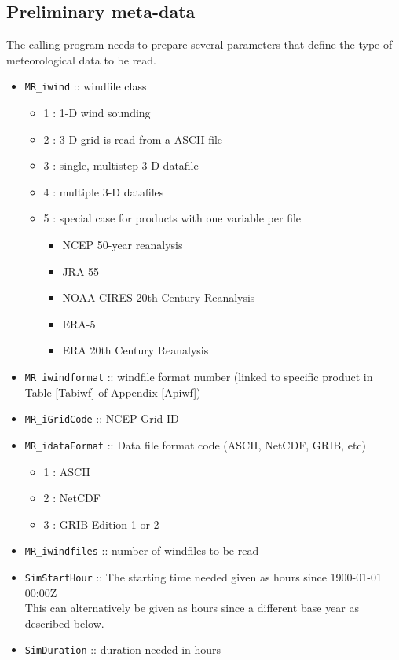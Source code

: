 \documentclass[11pt]{article}   %
\begin{document}
\subsection{Preliminary meta-data}\label{SSecPrelimMetaData}
The calling program needs to prepare several parameters that define the type of meteorological
data to be read.  
\begin{itemize}
\item \texttt{MR\_iwind} :: windfile class 
 \begin{itemize}
 \item 1 : 1-D wind sounding
 \item 2 : 3-D grid is read from a ASCII file
 \item 3 : single, multistep 3-D datafile
 \item 4 : multiple 3-D datafiles
 \item 5 : special case for products with one variable per file
   \begin{itemize}
     \item NCEP 50-year reanalysis
     \item JRA-55
     \item NOAA-CIRES 20th Century Reanalysis
     \item ERA-5
     \item ERA 20th Century Reanalysis
   \end{itemize}
 \end{itemize}
\item \texttt{MR\_iwindformat} :: windfile format number (linked to specific product in Table
  \ref{Tabiwf} of Appendix \ref{Apiwf})
\item \texttt{MR\_iGridCode} :: NCEP Grid ID
\item \texttt{MR\_idataFormat} :: Data file format code (ASCII, NetCDF, GRIB, etc)
 \begin{itemize}
 \item   1 : ASCII
 \item   2 : NetCDF
 \item   3 : GRIB Edition 1 or 2
 \end{itemize}
\item \texttt{MR\_iwindfiles} :: number of windfiles to be read
\item \texttt{SimStartHour} ::  The starting time needed given as hours since 1900-01-01 00:00Z\\
This can alternatively be given as hours since a different base year as described below.
\item \texttt{SimDuration} ::  duration needed in hours
\end{itemize}
\end{document}
